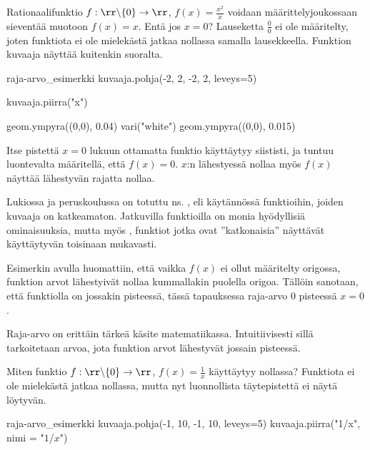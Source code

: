 Rationaalifunktio $f: \rr \backslash \{0 \} \to \rr$, $f(x) = \frac{x^2}{x}$ voidaan määrittelyjoukossaan sieventää muotoon $f(x) = x$. Entä jos $x = 0$? Lauseketta $\frac{0}{0}$ ei ole määritelty, joten funktiota ei ole mielekästä jatkaa nollassa samalla lausekkeella. Funktion kuvaaja näyttää kuitenkin suoralta.

\begin{luoKuva}{raja-arvo_esimerkki}
	kuvaaja.pohja(-2, 2, -2, 2, leveys=5)

	kuvaaja.piirra("x")
	
	geom.ympyra((0,0), 0.04)
	vari("white")
	geom.ympyra((0,0), 0.015)	
\end{luoKuva}

\begin{center}
\end{center}

Itse pistettä $x = 0$ lukuun ottamatta funktio käyttäytyy siististi, ja tuntuu luontevalta määritellä, että $f(x) = 0$. $x$:n lähestyessä nollaa myös $f(x)$ näyttää lähestyvän rajatta nollaa.

Lukiossa ja peruskoulussa on totuttu ns. , eli käytännössä funktioihin, joiden kuvaaja on katkeamaton. Jatkuvilla funktioilla on monia hyödyllisiä ominaisuuksia, mutta myös , funktiot jotka ovat ''katkonaisia'' näyttävät käyttäytyvän toisinaan mukavasti.

Esimerkin avulla huomattiin, että vaikka $f(x)$ ei ollut määritelty origossa, funktion arvot lähestyivät nollaa kummallakin puolella origoa. Tällöin sanotaan, että funktiolla on  jossakin pisteessä, tässä tapauksessa raja-arvo $0$ pisteessä $x=0$.

Raja-arvo on erittäin tärkeä käsite matematiikassa. Intuitiivisesti sillä tarkoitetaan arvoa, jota funktion arvot lähestyvät jossain pisteessä. %

Miten funktio  $f: \rr \backslash \{0 \} \to \rr$, $f(x) = \frac{1}{x}$ käyttäytyy nollassa? Funktiota ei ole mielekästä jatkaa nollassa, mutta nyt luonnollista täytepistettä ei näytä löytyvän.

\begin{luoKuva}{raja-arvo_esimerkki}
    kuvaaja.pohja(-1, 10, -1, 10, leveys=5)
    kuvaaja.piirra("1/x", nimi = "$1/x$")
\end{luoKuva}

